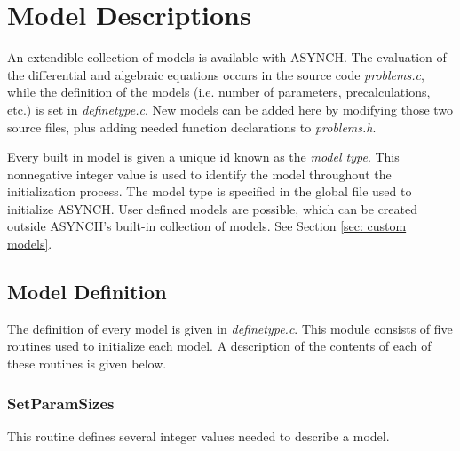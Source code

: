 \documentclass[12pt]{article}
\begin{document}
\section{Model Descriptions} \label{sec: model descriptions}

An extendible collection of models is available with ASYNCH. The evaluation of the differential and algebraic equations occurs in the source code \textit{problems.c}, while the definition of the models (i.e. number of parameters, precalculations, etc.) is set in \textit{definetype.c}. New models can be added here by modifying those two source files, plus adding needed function declarations to \textit{problems.h}.

Every built in model is given a unique id known as the \emph{model type}. This nonnegative integer value is used to identify the model throughout the initialization process. The model type is specified in the global file used to initialize ASYNCH. User defined models are possible, which can be created outside ASYNCH's built-in collection of models. See Section \ref{sec: custom models}.

\subsection{Model Definition} \label{sec: model definition}

The definition of every model is given in \textit{definetype.c}. This module consists of five routines used to initialize each model. A description of the contents of each of these routines is given below.

\subsubsection{SetParamSizes} \label{sec: setparamsizes}

This routine defines several integer values needed to describe a model.
\end{document}
